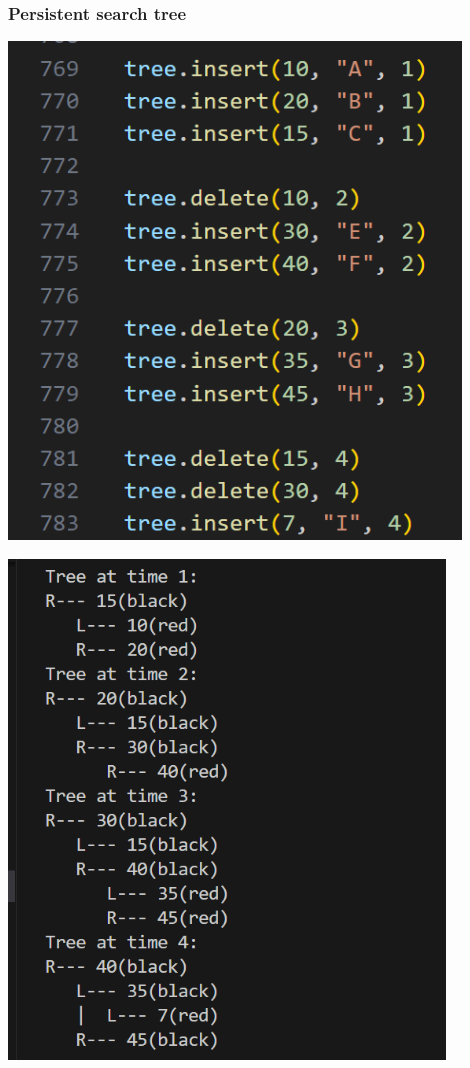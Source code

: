 \documentclass{beamer}
\begin{document}
\begin{frame}
    \frametitle{Persistent search tree}
    \begin{minipage}{0.5\textwidth}
        \includegraphics[width=0.9\textwidth]{treeCode.png}
    \end{minipage}%
    \begin{minipage}{0.5\textwidth}
        \includegraphics[width=0.87\textwidth]{treeOutput.png}
    \end{minipage}
\end{frame}
\end{document}
